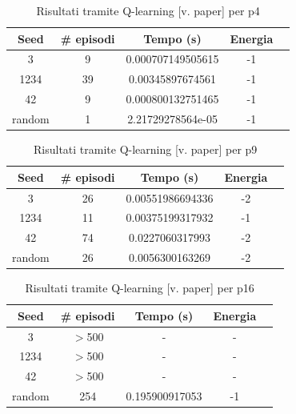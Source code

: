 \documentclass[conference]{IEEEtran}
\begin{document}
\begin{table}[H]
\begin{center}
\begin{tabular}{|c|c|c|c|c|}
\hline
\textbf{Seed} & \textbf{\# episodi} & \textbf{Tempo (s)} & \textbf{Energia} \\ \hline
3 & 9 & 0.000707149505615 & -1 \\ \hline
1234 & 39 & 0.00345897674561 & -1 \\ \hline
42 & 9 & 0.000800132751465 & -1 \\ \hline
random & 1 & 2.21729278564e-05 & -1 \\ \hline
\end{tabular}
\end{center}
\caption{Risultati tramite Q-learning [v. paper] per p4}
\end{table}

\begin{table}[H]
\begin{center}
\begin{tabular}{|c|c|c|c|c|}
\hline
\textbf{Seed} & \textbf{\# episodi} & \textbf{Tempo (s)} & \textbf{Energia} \\ \hline
3 & 26 & 0.00551986694336 & -2 \\ \hline
1234 & 11 & 0.00375199317932 & -1 \\ \hline
42 & 74 & 0.0227060317993 & -2 \\ \hline
random & 26 & 0.0056300163269 & -2 \\ \hline
\end{tabular}
\end{center}
\caption{Risultati tramite Q-learning [v. paper] per p9}
\end{table}

\begin{table}[H]
\begin{center}
\begin{tabular}{|c|c|c|c|c|}
\hline
\textbf{Seed} & \textbf{\# episodi} & \textbf{Tempo (s)} & \textbf{Energia} \\ \hline
3 & $>$500 & - & - \\ \hline
1234 & $>$500 & - & - \\ \hline
42 & $>$500 & - & - \\ \hline
random & 254 & 0.195900917053 & -1 \\ \hline
\end{tabular}
\end{center}
\caption{Risultati tramite Q-learning [v. paper] per p16}
\end{table}
\end{document}
